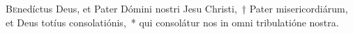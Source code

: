 
\lettrine{B}{e}nedíctus Deus, et Pater Dómini nostri Jesu Christi,~† Pater misericordiárum, et Deus totíus consolatiónis,~* qui consolátur nos in omni tribulatióne nostra.